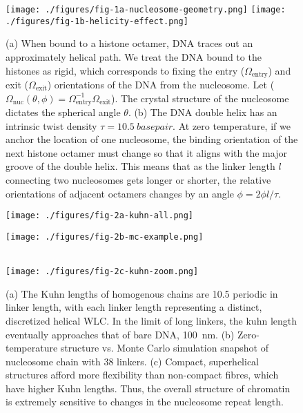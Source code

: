 \documentclass[%
 reprint,
superscriptaddress,
showpacs,preprintnumbers,
 amsmath,amssymb,
 aps,
 prl,
]{revtex4-1}
\begin{document}

\begin{figure}[t]
    \centering
    \texttt{[image: ./figures/fig-1a-nucleosome-geometry.png]}
    \texttt{[image: ./figures/fig-1b-helicity-effect.png]}
    \caption{(a) When bound to a histone octamer, DNA traces out an
    approximately helical path. We treat the DNA bound to the histones as rigid,
    which corresponds to fixing the entry ($\Omega_\text{entry}$) and exit
    ($\Omega_\text{exit}$) orientations of the DNA from the nucleosome. Let
    ($\Omega_\text{nuc}(\theta, \phi)  =
    \Omega_\text{entry}^{-1}\Omega_\text{exit}$). The crystal structure of the
    nucleosome dictates the spherical angle $\theta$.
    (b) The DNA double helix has an intrinsic twist density
    $\tau=\SI{10.5}{basepair}$. At zero
    temperature, if we anchor the location of one nucleosome, the binding
    orientation of the next histone octamer must change so that it aligns with
    the major groove of the double helix. This means that as the linker length
    $l$ connecting two nucleosomes gets longer or shorter, the relative
    orientations of adjacent octamers changes by an angle $\phi = 2\phi l/\tau$.
    }\label{fig:nuc-geo}
\end{figure}
\begin{figure}[t]
    \centering
    \begin{minipage}{0.65\linewidth}
        \texttt{[image: ./figures/fig-2a-kuhn-all.png]}
    \end{minipage}
    \begin{minipage}{0.30\linewidth}
        \vfill
        \texttt{[image: ./figures/fig-2b-mc-example.png]}
        \vfill
    \end{minipage}
    \\
    \texttt{[image: ./figures/fig-2c-kuhn-zoom.png]}
    \caption{(a) The Kuhn lengths of homogenous chains are
    \SI{10.5}{\basepair} periodic
    in linker length, with each linker length representing a distinct,
    discretized helical
    WLC. In the limit of long linkers, the kuhn length eventually approaches that of bare DNA,
    \SI{100}{\nano\metre}. (b) Zero-temperature structure vs. Monte Carlo simulation
    snapshot of nucleosome chain with \SI{38}{\basepair} linkers. (c) Compact, superhelical structures afford more
    flexibility than non-compact fibres, which have higher Kuhn lengths. Thus,
    the overall structure of chromatin is extremely sensitive to changes in the
    nucleosome repeat length.}
\end{figure}
\end{document}
